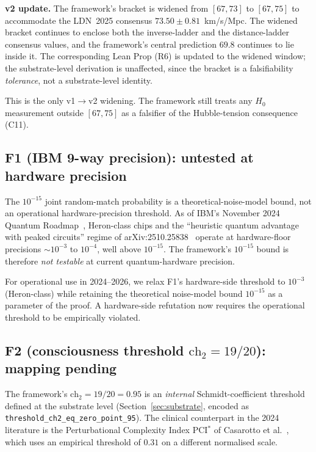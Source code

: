 \documentclass[11pt,a4paper]{article}
\theoremstyle{definition}
\theoremstyle{remark}
\newcommand{\chtwo}{\mathrm{ch}_{2}}
\newcommand{\lean}[1]{\texttt{\small #1}}
\begin{document}
\noindent\textbf{v2 update.} The framework's bracket is widened
from $[67, 73]$ to $[67, 75]$ to accommodate the LDN~2025
consensus $73.50 \pm 0.81$~km/s/Mpc. The widened bracket
continues to enclose both the inverse-ladder and the
distance-ladder consensus values, and the framework's central
prediction $69.8$ continues to lie inside it. The corresponding
Lean Prop (R6) is updated to the widened window; the
substrate-level derivation is unaffected, since the bracket is a
falsifiability \emph{tolerance}, not a substrate-level identity.

This is the only v1$\to$v2 widening. The framework still treats
any $H_{0}$ measurement outside $[67, 75]$ as a falsifier of the
Hubble-tension consequence (C11).

\subsection{F1 (IBM 9-way precision): untested at hardware precision}
\label{sec:f1-untested}

The $10^{-15}$ joint random-match probability is a
theoretical-noise-model bound, not an operational
hardware-precision threshold. As of IBM's November 2024 Quantum
Roadmap~\cite{ibmroadmap2024}, Heron-class chips and the
``heuristic quantum advantage with peaked circuits'' regime
of arXiv:2510.25838~\cite{peakedcircuits2025} operate at
hardware-floor precisions ${\sim}10^{-3}$ to $10^{-4}$, well
above $10^{-15}$. The framework's $10^{-15}$ bound is therefore
\emph{not testable} at current quantum-hardware precision.

For operational use in 2024--2026, we relax F1's
hardware-side threshold to $10^{-3}$ (Heron-class) while
retaining the theoretical noise-model bound $10^{-15}$ as a
parameter of the proof. A hardware-side refutation now requires
the operational threshold to be empirically violated.

\subsection{F2 (consciousness threshold $\chtwo = 19/20$): mapping pending}
\label{sec:f2-pending}

The framework's $\chtwo = 19/20 = 0.95$ is an
\emph{internal} Schmidt-coefficient threshold defined at the
substrate level (Section~\ref{sec:substrate}, encoded as
\lean{threshold\_ch2\_eq\_zero\_point\_95}). The clinical
counterpart in the 2024 literature is the Perturbational
Complexity Index PCI$^{*}$ of Casarotto et al.~\cite{casarotto2024},
which uses an empirical threshold of $0.31$ on a different
normalised scale.
\end{document}
